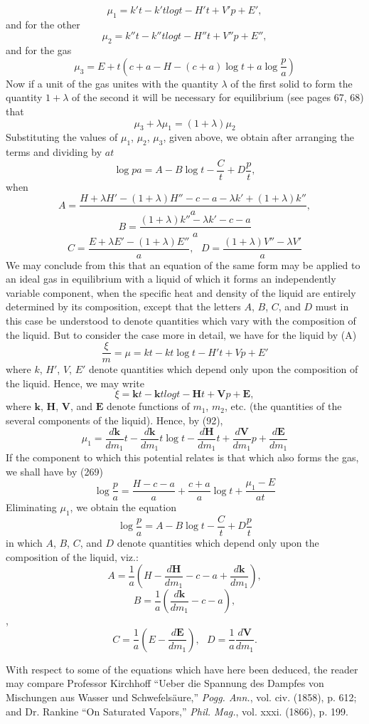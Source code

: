 \documentclass[12pt]{article}
\begin{document}
{$$\mu_1=  k't - k't log t - H't + V'p + E',$$
and for the other    
$$\mu_2= k''t - k''t log t - H''t + V''p + E'',$$
and for the gas      
$$\mu_3= E+t\left(c+a-H-(c+a) \log t+ a \log \frac{p}{a}\right)$$
Now if a unit of the gas unites with the quantity $\lambda$ of the first solid to form the quantity $1 +\lambda $ of the second it will be necessary for equilibrium (see pages 67, 68) that
$$ \mu_3 + \lambda \mu_1=(1 +\lambda) \mu_2$$
Substituting the values of $\mu_1$, $\mu_2$, $\mu_3$, given above, we obtain after arranging the terms and dividing by $at$
$$\log{p}{a} = A -B \log t -\frac{C}{t} + D \frac{p}{t},  $$
when    
$$ A= \frac{H+\lambda H' -(1 + \lambda)H''-c-a-\lambda k' + (1+\lambda)k''}{a},$$
$$B=\frac{(1+\lambda)k''-\lambda k' -c - a}{a}$$
$$C= \frac{E+\lambda E'- (1+\lambda)E''}{a} , \ \ \     D=\frac{(1 +\lambda) V''- \lambda V'}{a}$$
We may conclude from this that an equation of the same form may be applied to an ideal gas in equilibrium with a liquid of which it forms an independently variable component, when the specific heat and density of the liquid are entirely determined by its composition, except that the letters $A$, $B$, $C$, and $D$ must in this case be understood to denote quantities which vary with the composition of the liquid. But to consider the case more in detail, we have for the liquid by (A)
$$\frac{\xi}{m}= \mu = kt - kt \log t - H't + Vp + E'$$
where $k$, $H'$, $V$, $E'$ denote quantities which depend only upon the composition of the liquid. Hence, we may write
$$\xi=\mathbf{k}t - \mathbf{k}t log t - \mathbf{H}t + \mathbf{V}p + \mathbf{E},$$
where $\mathbf{k}$, $\mathbf{H}$, $\mathbf{V}$, and $\mathbf{E}$ denote functions of $m_1$, $m_2$, etc. (the quantities of the several components of the liquid). Hence, by (92),
$$\mu_1 = \frac{d\mathbf{k}}{dm_1 } t- \frac{d\mathbf{k}}{dm_1} t\log t - 
\frac{d\mathbf{H}}{dm_1 } t + \frac{d\mathbf{V}}{dm_1 }p+\frac{d\mathbf{E}}{dm_1 } $$
If the component to which this potential relates is that which also forms the gas, we shall have by (269)
$$\log \frac{p}{a}=\frac{H-c-a}{a} + \frac{c+a}{a} \log t + \frac{\mu_1-E}{at} $$
Eliminating $\mu_1$, we obtain the equation
$$\log\frac{p}{a}=A - B \log t - \frac{C}{t} + D \frac{p}{t}$$
in which $A$, $B$, $C$, and $D$ denote quantities which depend only upon the composition of the liquid, viz.:
$$A =  \frac{1}{a} \left(H- \frac{d\mathbf{H}}{dm_1}-c-a +\frac{d\mathbf{k}}{dm_1}\right),$$
$$B=  \frac{1}{a} \left( \frac{d\mathbf{k}}{dm_1}-c-a\right),$$,
$$C=\frac{1}{a} \left(E - \frac{d\mathbf{E}}{dm_1}\right), \ \ \  D=\frac{1}{a} \frac{d\mathbf{V}}{dm_1}.$$
\par With respect to some of the equations which have here been deduced, the reader may compare Professor Kirchhoff ``Ueber die Spannung des Dampfes von Mischungen aus Wasser und Schwefelsäure,'' \textit{Pogg. Ann.}, vol. civ. (1858), p. 612; and Dr. Rankine ``On Saturated Vapors,'' \textit{Phil. Mag.}, vol. xxxi. (1866), p. 199.}
\end{document}
